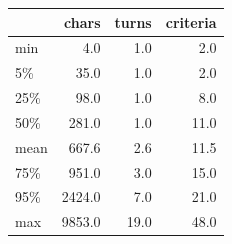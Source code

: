 \begin{tabular}{lrrr}
\toprule
        & chars    & turns   & criteria \\
\midrule
min     & 4.0    & 1.0    & 2.0     \\
5\%     & 35.0    & 1.0    & 2.0     \\
25\%    & 98.0    & 1.0    & 8.0     \\
50\%    & 281.0   & 1.0    & 11.0    \\
mean    & 667.6   & 2.6    & 11.5    \\
75\%    & 951.0   & 3.0    & 15.0    \\
95\%    & 2424.0  & 7.0    & 21.0    \\
max     & 9853.0  & 19.0   & 48.0    \\
\bottomrule
\end{tabular}